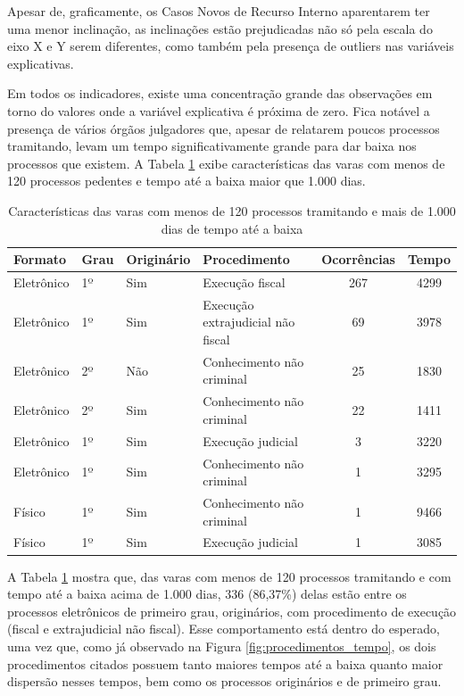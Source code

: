 Apesar de, graficamente, os Casos Novos de Recurso Interno aparentarem ter uma menor inclinação, as inclinações estão prejudicadas não só pela escala do eixo X e Y serem diferentes, como também pela presença de outliers nas variáveis explicativas.

Em todos os indicadores, existe uma concentração grande das observações em torno do valores onde a variável explicativa é próxima de zero. Fica notável a presença de vários órgãos julgadores que, apesar de relatarem poucos processos tramitando, levam um tempo significativamente grande para dar baixa nos processos que existem. A Tabela \ref{tbl:caracteristicas_pendentes_tempo_longo} exibe características das varas com menos de 120 processos pedentes e tempo até a baixa maior que 1.000 dias. 


\begin{table}[ht]
\centering
\caption{Características das varas com menos de 120 processos tramitando e mais de 1.000 dias de tempo até a baixa}
\begin{tabular}{llll|cc}
  \hline
  \textbf{Formato} & \textbf{Grau} & \textbf{Originário} & \textbf{Procedimento} & \textbf{Ocorrências} & \textbf{Tempo} \\ 
  \hline
  Eletrônico & 1º & Sim & Execução fiscal & 267 & 4299 \\ 
  Eletrônico & 1º & Sim & Execução extrajudicial não fiscal &  69 & 3978 \\ 
  Eletrônico & 2º & Não & Conhecimento não criminal &  25 & 1830 \\ 
  Eletrônico & 2º & Sim & Conhecimento não criminal &  22 & 1411 \\ 
  Eletrônico & 1º & Sim & Execução judicial &   3 & 3220 \\ 
  Eletrônico & 1º & Sim & Conhecimento não criminal &   1 & 3295 \\ 
  Físico & 1º & Sim & Conhecimento não criminal &   1 & 9466 \\ 
  Físico & 1º & Sim & Execução judicial &   1 & 3085 \\ 
   \hline
\end{tabular}
\label{tbl:caracteristicas_pendentes_tempo_longo}
\end{table}


A Tabela \ref{tbl:caracteristicas_pendentes_tempo_longo} mostra que, das varas com menos de 120 processos tramitando e com tempo até a baixa acima de 1.000 dias, 336 (86,37\%) delas estão entre os processos eletrônicos de primeiro grau, originários, com procedimento de execução (fiscal e extrajudicial não fiscal). Esse comportamento está dentro do  esperado, uma vez que, como já observado na Figura \ref{fig:procedimentos_tempo}, os dois procedimentos citados possuem tanto maiores tempos até a baixa quanto maior dispersão nesses tempos, bem como os processos originários e de primeiro grau.

